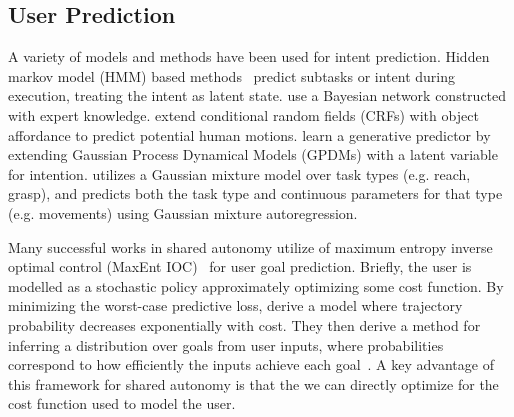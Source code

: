 \subsection{User Prediction}
\label{sec:related_prediction}


A variety of models and methods have been used for intent prediction. Hidden markov model (HMM) based methods~\citep{li_2003,kragic_2005, aarno_2005_virtualfixtures, aarno_2008} predict subtasks or intent during execution, treating the intent as latent state. \citet{schrempf_2007} use a Bayesian network constructed with expert knowledge. \citet{koppula_2013} extend conditional random fields (CRFs) with object affordance to predict potential human motions. \citet{wang_2013_intentioninference} learn a generative predictor by extending Gaussian Process Dynamical Models (GPDMs) with a latent variable for intention. \citet{hauser_2013} utilizes a Gaussian mixture model over task types (e.g. reach, grasp), and predicts both the task type and continuous parameters for that type (e.g. movements) using Gaussian mixture autoregression.


Many successful works in shared autonomy utilize of maximum entropy inverse optimal control (MaxEnt IOC)~\citep{ziebart_2008} for user goal prediction. Briefly, the user is modelled as a stochastic policy approximately optimizing some cost function. By minimizing the worst-case predictive loss, \citet{ziebart_2008} derive a model where trajectory probability decreases exponentially with cost. They then derive a method for inferring a distribution over goals from user inputs, where probabilities correspond to how efficiently the inputs achieve each goal~\citep{ziebart_2009}. A key advantage of this framework for shared autonomy is that the we can directly optimize for the cost function used to model the user.

